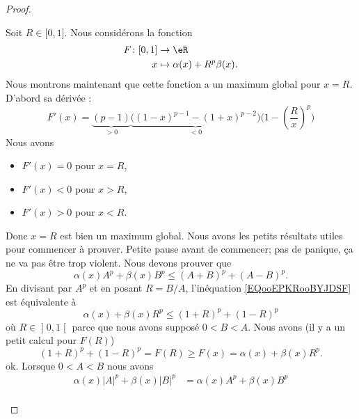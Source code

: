 \begin{proof}
\begin{subproof}
		Soit \( R\in \mathopen[ 0 , 1 \mathclose]\). Nous considérons la fonction
		\begin{equation}
			\begin{aligned}
				F\colon \mathopen[ 0 , 1 \mathclose] & \to \eR                        \\
				x                                    & \mapsto \alpha(x)+R^p\beta(x).
			\end{aligned}
		\end{equation}
		Nous montrons maintenant que cette fonction a un maximum global pour \( x=R\). D'abord sa dérivée :
		\begin{equation}
			F'(x)=\underbrace{(p-1)}_{>0}\underbrace{\Big( (1-x)^{p-1}-(1+x)^{p-2} \Big)}_{<0}\Big( 1-\left( \frac{ R }{ x } \right)^p \Big)
		\end{equation}
		Nous avons
		\begin{itemize}
			\item \( F'(x)=0\) pour \( x=R\),
			\item \( F'(x)<0\) pour \( x>R\),
			\item \( F'(x)>0\) pour \( x<R\).
		\end{itemize}
		Donc \( x=R\) est bien un maximum global.
		\spitem[Pause]
		Nous avons les petits résultats utiles pour commencer à prouver. Petite pause avant de commencer; pas de panique, ça ne va pas être trop violent.
		\spitem[Pour \( 0<B<A\)]
		Nous devons prouver que
		\begin{equation}        \label{EQooEPKRooBYJDSF}
			\alpha(x)A^p+\beta(x)B^p\leq (A+B)^p+(A-B)^p.
		\end{equation}
		En divisant par \( A^p\) et en posant \( R=B/A\), l'inéquation \eqref{EQooEPKRooBYJDSF} est équivalente à
		\begin{equation}
			\alpha(x)+\beta(x)R^p\leq (1+R)^p+(1-R)^p
		\end{equation}
		où \( R\in \mathopen] 0 , 1 \mathclose[\) parce que nous avons supposé \( 0<B<A\). Nous avons (il y a un petit calcul pour \( F(R)\))
		\begin{equation}
			(1+R)^p+(1-R)^p=F(R)\geq F(x)=\alpha(x)+\beta(x)R^p.
		\end{equation}
		ok.
		\spitem[Pour \( 0<A<B\)]
		Lorsque \( 0<A<B\) nous avons
		\begin{subequations}
			\begin{align}
				\alpha(x)| A |^p+\beta(x)| B |^p & =\alpha(x)A^p+\beta(x)B^p                                      \\

\end{align}
\end{subequations}
\end{subproof}
\end{proof}
